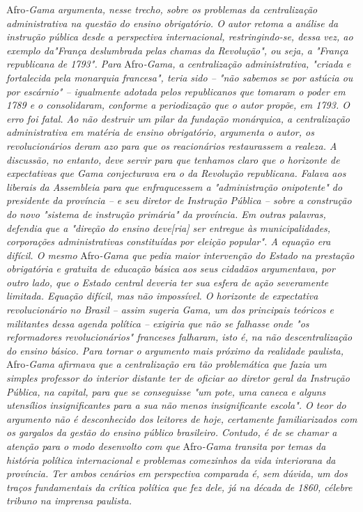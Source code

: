 Afro\emph{-Gama argumenta, nesse trecho, sobre os problemas da
centralização administrativa na questão do ensino obrigatório. O autor
retoma a análise da instrução pública desde a perspectiva internacional,
restringindo-se, dessa vez, ao exemplo da"França deslumbrada pelas
chamas da Revolução", ou seja, a "França republicana de 1793". Para}
Afro\emph{-Gama, a centralização administrativa, "criada e fortalecida
pela monarquia francesa", teria sido -- "não sabemos se por astúcia ou
por escárnio" -- igualmente adotada pelos republicanos que tomaram o
poder em 1789 e o consolidaram, conforme a periodização que o autor
propõe, em 1793. O erro foi fatal. Ao não destruir um pilar da fundação
monárquica, a centralização administrativa em matéria de ensino
obrigatório, argumenta o autor, os revolucionários deram azo para que os
reacionários restaurassem a realeza. A discussão, no entanto, deve
servir para que tenhamos claro que o horizonte de expectativas que Gama
conjecturava era o da Revolução republicana. Falava aos liberais da
Assembleia para que enfraqucessem a "administração onipotente" do
presidente da província -- e seu diretor de Instrução Pública -- sobre a
construção do novo "sistema de instrução primária" da província. Em
outras palavras, defendia que a "direção do ensino deve{[}ria{]} ser
entregue às municipalidades, corporações administrativas constituídas
por eleição popular". A equação era difícil. O mesmo} Afro\emph{-Gama
que pedia maior intervenção do Estado na prestação obrigatória e
gratuita de educação básica aos seus cidadãos argumentava, por outro
lado, que o Estado central deveria ter sua esfera de ação severamente
limitada. Equação difícil, mas não impossível. O horizonte de
expectativa revolucionário no Brasil -- assim sugeria Gama, um dos
principais teóricos e militantes dessa agenda política -- exigiria que
não se falhasse onde "os reformadores revolucionários" franceses
falharam, isto é, na não descentralização do ensino básico. Para tornar
o argumento mais próximo da realidade paulista,} Afro\emph{-Gama
afirmava que a centralização era tão problemática que fazia um simples
professor do interior distante ter de oficiar ao diretor geral da
Instrução Pública, na capital, para que se conseguisse "um pote, uma
caneca e alguns utensílios insignificantes para a sua não menos
insignificante escola". O teor do argumento não é desconhecido dos
leitores de hoje, certamente familiarizados com os gargalos da gestão do
ensino público brasileiro. Contudo, é de se chamar a atenção para o modo
desenvolto com que} Afro\emph{-Gama transita por temas da história
política internacional e problemas comezinhos da vida interiorana da
província. Ter ambos cenários em perspectiva comparada é, sem dúvida, um
dos traços fundamentais da crítica política que fez dele, já na década
de 1860, célebre tribuno na imprensa paulista.}

